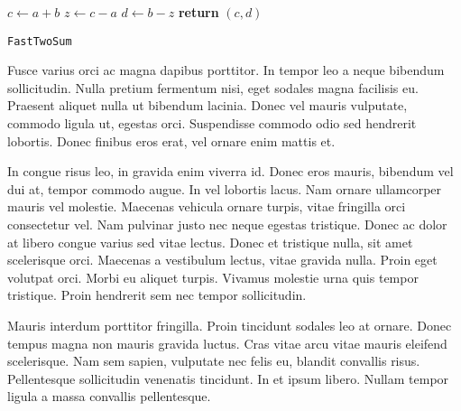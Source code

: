 \documentclass{article}
\begin{document}
\begin{center}
	\begin{minipage}{0.5\linewidth} %
		\begin{algorithm}[H]
			\medskip
			$c \leftarrow a + b$ \;
			$z \leftarrow c - a$ \;
			$d \leftarrow b - z$ \;
			{\bf return} $(c,d)$ \;
			\caption{\texttt{FastTwoSum}} %
			\label{alg:fastTwoSum}   %
		\end{algorithm}
	\end{minipage}
\end{center}

Fusce varius orci ac magna dapibus porttitor. In tempor leo a neque bibendum sollicitudin. Nulla pretium fermentum nisi, eget sodales magna facilisis eu. Praesent aliquet nulla ut bibendum lacinia. Donec vel mauris vulputate, commodo ligula ut, egestas orci. Suspendisse commodo odio sed hendrerit lobortis. Donec finibus eros erat, vel ornare enim mattis et.

\begin{question}
	In congue risus leo, in gravida enim viverra id. Donec eros mauris, bibendum vel dui at, tempor commodo augue. In vel lobortis lacus. Nam ornare ullamcorper mauris vel molestie. Maecenas vehicula ornare turpis, vitae fringilla orci consectetur vel. Nam pulvinar justo nec neque egestas tristique. Donec ac dolor at libero congue varius sed vitae lectus. Donec et tristique nulla, sit amet scelerisque orci. Maecenas a vestibulum lectus, vitae gravida nulla. Proin eget volutpat orci. Morbi eu aliquet turpis. Vivamus molestie urna quis tempor tristique. Proin hendrerit sem nec tempor sollicitudin.
\end{question}

Mauris interdum porttitor fringilla. Proin tincidunt sodales leo at ornare. Donec tempus magna non mauris gravida luctus. Cras vitae arcu vitae mauris eleifend scelerisque. Nam sem sapien, vulputate nec felis eu, blandit convallis risus. Pellentesque sollicitudin venenatis tincidunt. In et ipsum libero. Nullam tempor ligula a massa convallis pellentesque.

\end{document}
